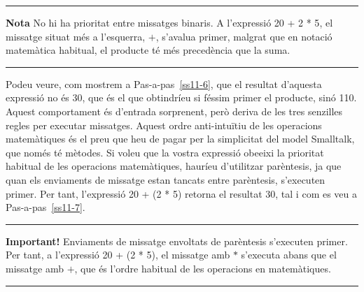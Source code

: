 \noindent
\rule{\textwidth}{2pt}
\noindent
\textbf{Nota} No hi ha prioritat entre missatges binaris. A l'expressió \textsf{20 + 2 * 5}, el missatge situat més a l'esquerra, \textsf{$+$}, s'avalua primer, malgrat que en notació matemàtica habitual, el producte té més precedència que la suma.\\
\noindent
\rule{\textwidth}{2pt}

\vspace*{5mm}

Podeu veure, com mostrem a Pas-a-pas~\ref{ss11-6}, que el resultat d'aquesta expressió no és \textsf{30}, que és el que obtindríeu si féssim primer el producte, sinó \textsf{110}. Aquest comportament és d'entrada sorprenent, però deriva de les tres senzilles regles per executar missatges. Aquest ordre anti-intuïtiu de les operacions matemàtiques és el preu que heu de pagar per la simplicitat del model Smalltalk, que només té mètodes. Si voleu que la vostra expressió obeeixi la prioritat habitual de les operacions matemàtiques, hauríeu d'utilitzar parèntesis, ja que quan els enviaments de missatge estan tancats entre parèntesis, s'executen primer. Per tant, l'expressió \textsf{20 + (2 * 5)}  retorna el resultat \textsf{30}, tal i com es veu a Pas-a-pas~\ref{ss11-7}.

\vspace*{5mm}

\noindent
\rule{\textwidth}{2pt}
\noindent
\textbf{Important!} Enviaments de missatge envoltats de parèntesis s'executen primer. Per tant, a l'expressió \textsf{20 + (2 * 5)}, el missatge amb \textsf{$*$} s'executa abans que el missatge amb \textsf{$+$}, que és l'ordre habitual de les operacions en matemàtiques.\\
\noindent
\rule{\textwidth}{2pt}

\vspace*{5mm}

